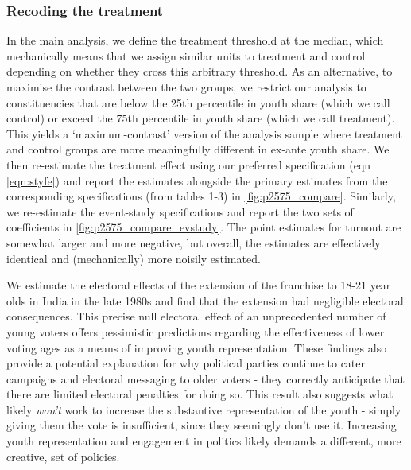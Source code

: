 \subsubsection{Recoding the treatment} In the main analysis, we define the
treatment threshold at the median, which mechanically means that we
assign similar units to treatment and control depending on whether
they cross this arbitrary threshold. As an alternative, to maximise
the contrast between the two groups, we restrict our analysis to
constituencies that are below the 25th percentile in youth share
(which we call control) or exceed the 75th percentile in youth share
(which we call treatment). This yields a `maximum-contrast' version of
the analysis sample where treatment and control groups are more
meaningfully different in ex-ante youth share. We then re-estimate the
treatment effect using our preferred specification (eqn
\ref{eqn:styfe}) and report the estimates alongside the primary
estimates from the corresponding specifications (from tables 1-3) in
\ref{fig:p2575_compare}. Similarly, we re-estimate the event-study
specifications and report the two sets of coefficients in
\ref{fig:p2575_compare_evstudy}. The point estimates for turnout are
somewhat larger and more negative, but overall, the estimates are
effectively identical and (mechanically) more noisily estimated.



\label{sec:conc}


We estimate the electoral effects of the extension of the franchise to
18-21 year olds in India in the late 1980s and find that the extension
had negligible electoral consequences. This precise null electoral
effect of an unprecedented number of young voters offers pessimistic
predictions regarding the effectiveness of lower voting ages as a
means of improving youth representation. These findings also provide a
potential explanation for why political parties continue to cater
campaigns and electoral messaging to older voters - they correctly
anticipate that there are limited electoral penalties for doing so.
This result also suggests what likely \emph{won't} work to increase
the substantive representation of the youth - simply giving them the
vote is insufficient, since they seemingly don't use it. Increasing
youth representation and engagement in politics likely demands a
different, more creative, set of policies.

